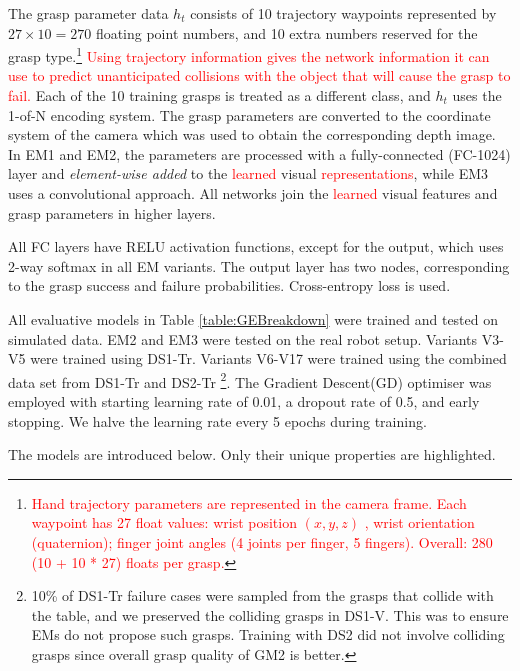 The grasp parameter data $h_t$ consists of 10 trajectory waypoints represented by $27 \times 10 = 270$ floating point numbers, and 10 extra numbers reserved for the grasp type.\footnote{\textcolor{red}{Hand trajectory parameters are represented in the camera frame. Each waypoint has 27 float values: wrist position $(x,y,z)$ , wrist orientation (quaternion); finger joint angles (4 joints per finger, 5 fingers). Overall: 280 (10 + 10 * 27) floats per grasp.}} \textcolor{red}{Using trajectory information gives the network information it can use to predict unanticipated collisions with the object that will cause the grasp to fail.} Each of the 10 training grasps is treated as a different class, and $h_t$ uses the 1-of-N encoding system. The grasp parameters are converted to the coordinate system of the camera which was used to obtain the corresponding depth image. In EM1 and EM2, the parameters are processed with a fully-connected (FC-1024) layer and \textit{element-wise added} to the \textcolor{red}{learned} visual \textcolor{red}{representations}, while EM3 uses a convolutional approach. All networks join the \textcolor{red}{learned} visual features and grasp parameters in higher layers.

All FC layers have RELU activation functions, except for the output, which uses 2-way softmax in all EM variants. The output layer has two nodes, corresponding to the grasp success and failure probabilities. Cross-entropy loss is used. %

All evaluative models in Table \ref{table:GEBreakdown} were trained and tested on simulated data. EM2 and EM3 were tested on the real robot setup. Variants V3-V5 were trained using DS1-Tr. Variants V6-V17 were trained using the combined data set from DS1-Tr and DS2-Tr \footnote{10\% of DS1-Tr failure cases were sampled from the grasps that collide with the table, and we preserved the colliding grasps in DS1-V. This was to ensure EMs do not propose such grasps. Training with DS2 did not involve colliding grasps since overall grasp quality of GM2 is better.}. The Gradient Descent(GD) optimiser was employed with starting learning rate of 0.01, a dropout rate of 0.5, and early stopping. We halve the learning rate every 5 epochs during training.


The models are introduced below. Only their unique properties are highlighted.

